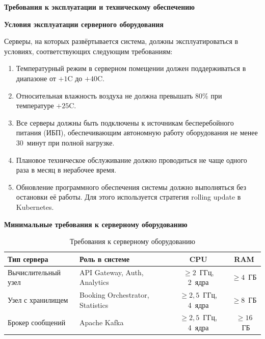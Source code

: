 \documentclass{bmstu}
\begin{document}
\begin{center}
    \textbf{Требования к эксплуатации и техническому обеспечению}
\end{center}

\begin{center}
    \textbf{Условия эксплуатации серверного оборудования}
\end{center}

Серверы, на которых развёртывается система, должны эксплуатироваться в условиях, соответствующих следующим требованиям:

\begin{enumerate}
    \item Температурный режим в серверном помещении должен поддерживаться в диапазоне от $+1$\textdegree C до $+40$\textdegree C.
    
    \item Относительная влажность воздуха не должна превышать 80\% при температуре $+25$\textdegree C.
    
    \item Все серверы должны быть подключены к источникам бесперебойного питания (ИБП), обеспечивающим автономную работу оборудования не менее 30~минут при полной нагрузке.
    
    \item Плановое техническое обслуживание должно проводиться не чаще одного раза в месяц в нерабочее время.
    
    \item Обновление программного обеспечения системы должно выполняться без остановки её работы. Для этого используется стратегия rolling update в Kubernetes.
\end{enumerate}

\begin{center}
    \textbf{Минимальные требования к серверному оборудованию}
\end{center}

\begin{table}[h]
\centering
\caption{Требования к серверному оборудованию}
\label{tab:server_requirements}
\begin{tabularx}{\textwidth}{|l|X|c|c|}
\hline
\textbf{Тип сервера} & \textbf{Роль в системе} & \textbf{CPU} & \textbf{RAM} \\
\hline
Вычислительный узел & API Gateway, Auth, Analytics & $\geq 2$~ГГц, 2~ядра & $\geq 4$~ГБ \\
\hline
Узел с хранилищем & Booking Orchestrator, Statistics & $\geq 2{,}5$~ГГц, 4~ядра & $\geq 8$~ГБ \\
\hline
Брокер сообщений & Apache Kafka & $\geq 2{,}5$~ГГц, 4~ядра & $\geq 16$~ГБ \\
\hline
\end{tabularx}
\end{table}
\end{document}
